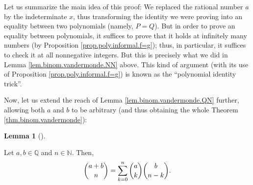 \documentclass[numbers=enddot,12pt,final,onecolumn,notitlepage]{scrartcl}%
\numberwithin{exer}{subsection}
\theoremstyle{definition}
\newtheorem{lem}[theo]{Lemma}
\newenvironment{lemma}[1][]
{\begin{lem}[#1]\begin{leftbar}}
{\end{leftbar}\end{lem}}
\let\sumnonlimits\sum
\renewcommand{\sum}{\sumnonlimits\limits}
\begin{document}
Let us summarize the main idea of this proof: We replaced the rational number
$a$ by the indeterminate $x$, thus transforming the identity we were proving
into an equality between two polynomials (namely, $P=Q$). But in order to
prove an equality between polynomials, it suffices to prove that it holds at
infinitely many numbers (by Proposition \ref{prop.poly.informal.f=g}); thus,
in particular, it suffices to check it at all nonnegative integers. But this
is precisely what we did in Lemma \ref{lem.binom.vandermonde.NN} above. This
kind of argument (with its use of Proposition \ref{prop.poly.informal.f=g}) is
known as the \textquotedblleft polynomial identity trick\textquotedblright.

Now, let us extend the reach of Lemma \ref{lem.binom.vandermonde.QN} further,
allowing both $a$ and $b$ to be arbitrary (and thus obtaining the whole
Theorem \ref{thm.binom.vandermonde}):

\begin{lemma}
\label{lem.binom.vandermonde.QQ}Let $a,b\in\mathbb{Q}$ and $n\in\mathbb{N}$.
Then,%
\[
\dbinom{a+b}{n}=\sum_{k=0}^{n}\dbinom{a}{k}\dbinom{b}{n-k}.
\]

\end{lemma}
\end{document}
